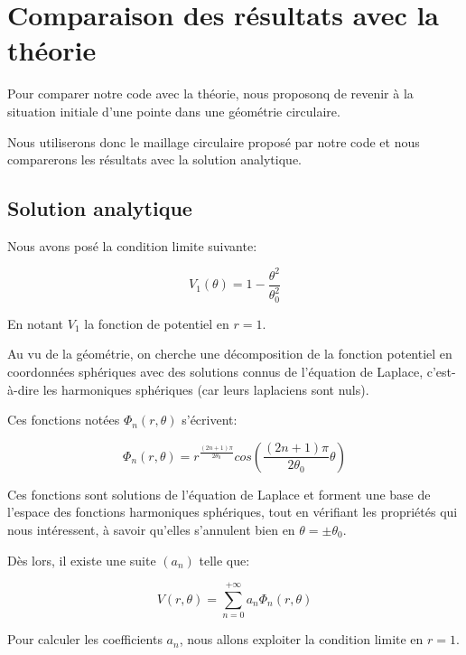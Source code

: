 \documentclass{article}
\begin{document}
\newpage

\section{Comparaison des résultats avec la théorie}

Pour comparer notre code avec la théorie,
nous proposonq de revenir à la situation initiale
d'une pointe dans une géométrie circulaire.

Nous utiliserons donc le maillage circulaire proposé
par notre code et nous comparerons les résultats
avec la solution analytique.

\subsection{Solution analytique}

Nous avons posé la condition limite suivante:

\begin{equation}
    V_1(\theta) = 1 - \frac{\theta^2}{\theta_0^2}
\end{equation}

En notant $V_1$ la fonction de potentiel en $r=1$.

Au vu de la géométrie, on cherche une décomposition
de la fonction potentiel en coordonnées sphériques
avec des solutions connus de l'équation de Laplace,
c'est-à-dire les harmoniques sphériques (car leurs
laplaciens sont nuls).

Ces fonctions notées $\Phi_n(r, \theta)$ s'écrivent:

\begin{equation}
    \Phi_n(r, \theta) =
    r^{\frac{(2n+1)\pi}{2 \theta_0}}
    cos\left(\frac{(2n+1)\pi}{2\theta_0}\theta\right)
\end{equation}

Ces fonctions sont solutions de l'équation de Laplace
et forment une base de l'espace des fonctions harmoniques
sphériques, tout en vérifiant les propriétés qui
nous intéressent, à savoir qu'elles s'annulent bien
en $\theta = \pm \theta_0$.

Dès lors, il existe une suite $(a_n)$ telle que:

\begin{equation}
    V(r,\theta) = \sum_{n=0}^{+\infty} a_n \Phi_n(r, \theta)
\end{equation}

Pour calculer les coefficients $a_n$, nous allons exploiter
la condition limite en $r=1$.
\end{document}
